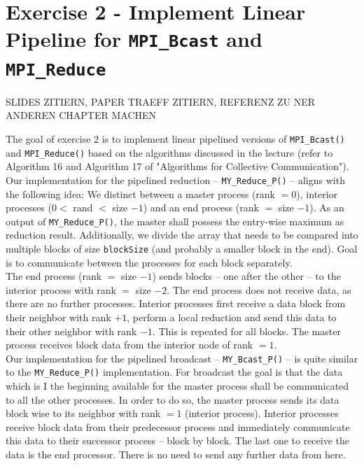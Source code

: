 \section{Exercise 2 - Implement Linear Pipeline for \texttt{MPI\_Bcast} and \texttt{MPI\_Reduce}}

SLIDES ZITIERN, PAPER TRAEFF ZITIERN, REFERENZ ZU NER ANDEREN CHAPTER MACHEN

The goal of exercise 2 is to implement linear pipelined versions of \texttt{MPI\_Bcast()} and \texttt{MPI\_Reduce()} 
based on the algorithms discussed in the lecture (refer to Algorithm 16 and Algorithm 17 of "Algorithms for Collective 
Communication"). \\

Our implementation for the pipelined reduction -- \texttt{MY\_Reduce\_P()} – aligns with the following idea: We 
distinct between a master process (rank $= 0$), interior processes ($0 <$ rand $<$ size $-1$) and an end process 
(rank $=$ size $-1$). As an output of \texttt{MY\_Reduce\_P()}, the master shall possess the entry-wise maximum as 
reduction result. Additionally, we divide the array that needs to be compared into multiple blocks of size 
\texttt{blockSize} (and probably a smaller block in the end). Goal is to communicate between the processes for each 
block separately. \\

The end process (rank $=$ size $-1$) sends blocks – one after the other -- to the interior process with 
rank $=$ size $-2$. The end process does not receive data, as there are no further processes. Interior processes 
first receive a data block from their neighbor with rank $+1$, perform a local reduction and send this data to their 
other neighbor with rank $-1$. This is repeated for all blocks. The master process receives block data from the interior 
node of rank $=1$.\\

Our implementation for the pipelined broadcast -- \texttt{MY\_Bcast\_P()} – is quite similar to the 
\texttt{MY\_Reduce\_P()} implementation. For broadcast the goal is that the data which is I the beginning 
available for the master process shall be communicated to all the other processes. In order to do so, the master 
process sends its data block wise to its neighbor with rank $=1$ (interior process). Interior processes receive block 
data from their predecessor process and immediately communicate this data to their successor process – block by 
block. The last one to receive the data is the end processor. There is no need to send any further data from here.\\

